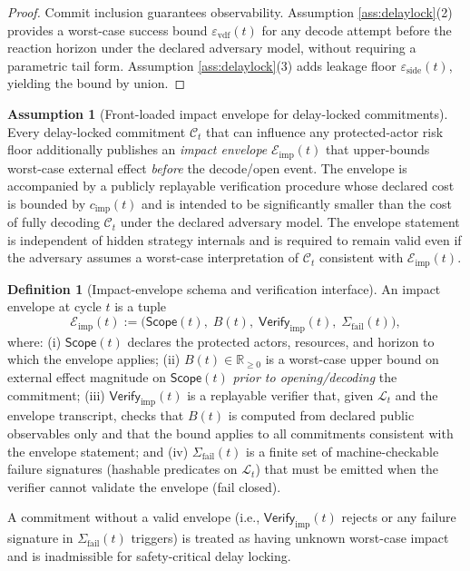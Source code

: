 \documentclass[11pt,a4paper]{article}
\newcommand{\R}{\mathbb{R}}
\newcommand{\eps}{\varepsilon}
\newcommand{\cL}{\mathcal{L}}
\theoremstyle{definition}
\newtheorem{definition}{Definition}
\newtheorem{assumption}{Assumption}
\theoremstyle{remark}
\begin{document}
\begin{proof}
Commit inclusion guarantees observability.
Assumption \ref{ass:delaylock}(2) provides a worst-case success bound $\eps_{\mathrm{vdf}}(t)$ for any decode attempt before the reaction horizon under the declared adversary model, without requiring a parametric tail form.
Assumption \ref{ass:delaylock}(3) adds leakage floor $\eps_{\mathrm{side}}(t)$, yielding the bound by union.
\end{proof}

\begin{assumption}[Front-loaded impact envelope for delay-locked commitments]\label{ass:frontload}
Every delay-locked commitment $\mathcal C_t$ that can influence any protected-actor risk floor additionally publishes an \emph{impact envelope} $\mathcal E_{\mathrm{imp}}(t)$ that upper-bounds worst-case external effect \emph{before} the decode/open event.
The envelope is accompanied by a publicly replayable verification procedure whose declared cost is bounded by $c_{\mathrm{imp}}(t)$ and is intended to be significantly smaller than the cost of fully decoding $\mathcal C_t$ under the declared adversary model.
The envelope statement is independent of hidden strategy internals and is required to remain valid even if the adversary assumes a worst-case interpretation of $\mathcal C_t$ consistent with $\mathcal E_{\mathrm{imp}}(t)$.
\end{assumption}
\begin{definition}[Impact-envelope schema and verification interface]\label{def:impact_envelope_schema}
An impact envelope at cycle $t$ is a tuple
\[
\mathcal E_{\mathrm{imp}}(t):=\big(\mathsf{Scope}(t),\;B(t),\;\mathsf{Verify}_{\mathrm{imp}}(t),\;\Sigma_{\mathrm{fail}}(t)\big),
\]
where:
(i) $\mathsf{Scope}(t)$ declares the protected actors, resources, and horizon to which the envelope applies;
(ii) $B(t)\in\R_{\ge 0}$ is a worst-case upper bound on external effect magnitude on $\mathsf{Scope}(t)$ \emph{prior to opening/decoding} the commitment;
(iii) $\mathsf{Verify}_{\mathrm{imp}}(t)$ is a replayable verifier that, given $\cL_t$ and the envelope transcript, checks that $B(t)$ is computed from declared public observables only and that the bound applies to all commitments consistent with the envelope statement; and
(iv) $\Sigma_{\mathrm{fail}}(t)$ is a finite set of machine-checkable failure signatures (hashable predicates on $\cL_t$) that must be emitted when the verifier cannot validate the envelope (fail closed).

A commitment without a valid envelope (i.e., $\mathsf{Verify}_{\mathrm{imp}}(t)$ rejects or any failure signature in $\Sigma_{\mathrm{fail}}(t)$ triggers) is treated as having unknown worst-case impact and is inadmissible for safety-critical delay locking.
\end{definition}
\end{document}
